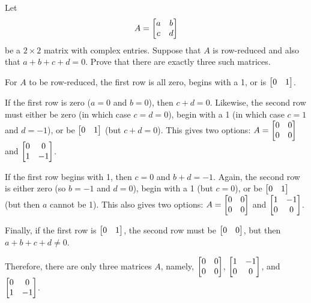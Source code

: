 \begin{xca}
  Let \[ A = \begin{bmatrix}a&b\\c&d\end{bmatrix} \] be a $2 \times 2$ matrix with complex entries.
  Suppose that $A$ is row-reduced and also that $a+b+c+d=0$.
  Prove that there are exactly three such matrices.
\end{xca}
\begin{prf}
  For $A$ to be row-reduced, the first row is all zero, begins with a 1, or is $\begin{bmatrix}0&1\end{bmatrix}$.

  If the first row is zero ($a = 0$ and $b = 0$), then $c+d = 0$.
  Likewise, the second row must either be zero (in which case $c = d = 0$),
  begin with a 1 (in which case $c = 1$ and $d = -1$),
  or be $\begin{bmatrix}0&1\end{bmatrix}$ (but $c+d = 0$).
  This gives two options: $A = \begin{bmatrix}0&0\\0&0\end{bmatrix}$ and $\begin{bmatrix}0&0\\1&-1\end{bmatrix}$.

  If the first row begins with 1, then $c = 0$ and $b+d = -1$.
  Again, the second row is either zero (so $b = -1$ and $d = 0$),
  begin with a 1 (but $c = 0$),
  or be $\begin{bmatrix}0&1\end{bmatrix}$ (but then $a$ cannot be 1).
  This also gives two options: $A = \begin{bmatrix}0&0\\0&0\end{bmatrix}$ and $\begin{bmatrix}1&-1\\0&0\end{bmatrix}$.

  Finally, if the first row is $\begin{bmatrix}0&1\end{bmatrix}$, the second row must be $\begin{bmatrix}0&0\end{bmatrix}$,
  but then $a+b+c+d \neq 0$.

  Therefore, there are only three matrices $A$, namely,
  $\begin{bmatrix}0&0\\0&0\end{bmatrix}$, $\begin{bmatrix}1&-1\\0&0\end{bmatrix}$, and $\begin{bmatrix}0&0\\1&-1\end{bmatrix}$.
\end{prf}

